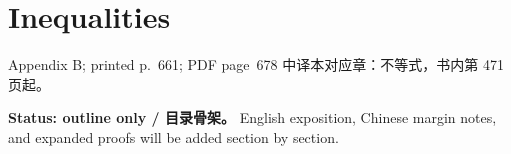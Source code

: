 \chapter{Inequalities}
\label{app:inequalities}

\PDESource
  {Appendix B; printed p.~661; PDF page~678}
  {中译本对应章：不等式，书内第 471 页起。}

\noindent\textbf{Status: outline only / 目录骨架。}
English exposition, Chinese margin notes, and expanded proofs will be added section by section.



